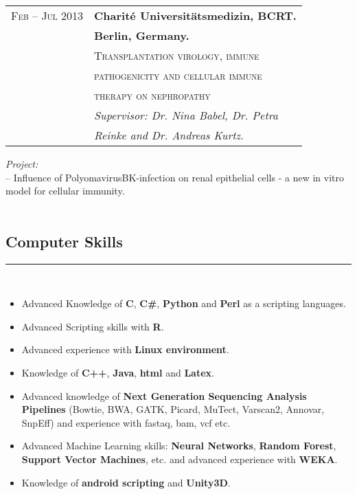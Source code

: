\documentclass[10pt]{article} %
\begin{document}
\begin{minipage}[t]{0.5\textwidth}
\begin{spacing}{1.2}
\begin{tabular}{rl} %
\textsc{Feb -- Jul 2013}	 & \textbf{Charité Universitätsmedizin, BCRT.}\\
& \textbf{Berlin, Germany.}\\
& \textsc{Transplantation virology, immune }\\
& \textsc{pathogenicity and cellular immune}\\
& \textsc{therapy on nephropathy}\\
& \textit{Supervisor: Dr. Nina Babel, Dr. Petra}\\
& \textit{Reinke and Dr. Andreas Kurtz.}\\
\end{tabular}
\normalsize{\emph{Project:} \\-- Influence of PolyomavirusBK-infection on renal epithelial cells - a new in vitro model for cellular immunity.}\\ \\

\end{spacing}

\begin{spacing}{0.0}
\section{Computer Skills}
\end{spacing}
\rule{9.5cm}{0.4pt}
\\
\begin{itemize}
\item Advanced Knowledge of \textbf{C}, \textbf{C\#}, \textbf{Python} and  \textbf{Perl} as a scripting languages.
\item Advanced Scripting skills with \textbf{R}.
\item Advanced experience with \textbf{Linux environment}.
\item Knowledge of \textbf{C++}, \textbf{Java}, \textbf{html} and \textbf{Latex}.
\item Advanced knowledge of \textbf{Next Generation Sequencing Analysis Pipelines} (Bowtie, BWA, GATK, Picard, MuTect, Varscan2, Annovar, SnpEff) and experience with fastaq, bam, vcf etc. 
\item Advanced Machine Learning skills: \textbf{Neural Networks}, \textbf{Random Forest}, \textbf{Support Vector Machines}, etc. and advanced experience with \textbf{WEKA}.
\item Knowledge of \textbf{android scripting} and \textbf{Unity3D}.
\end{itemize}




\end{minipage} %
\end{document}
